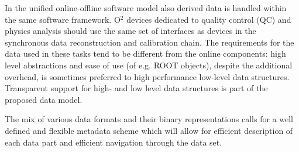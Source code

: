 \documentclass[a4paper,twoside]{article}
\def\O2{O$^2$}
\begin{document}
In the unified online-offline software model also derived data is handled within the same software framework. \O2 devices dedicated to quality control (QC) and physics analysis should use the same set of interfaces as devices in the synchronous data reconstruction and calibration chain. The requirements for the data used in these tasks tend to be different from the online components: high level abstractions and ease of use (of e.g. ROOT\cite{root} objects), despite the additional overhead, is sometimes preferred to high performance low-level data structures. Transparent support for high- and low level data structures is part of the proposed data model.

The mix of various data formats and their binary representations calls for a well defined and flexible metadata scheme which will allow for efficient description of each data part and efficient navigation through the data set.
\end{document}
